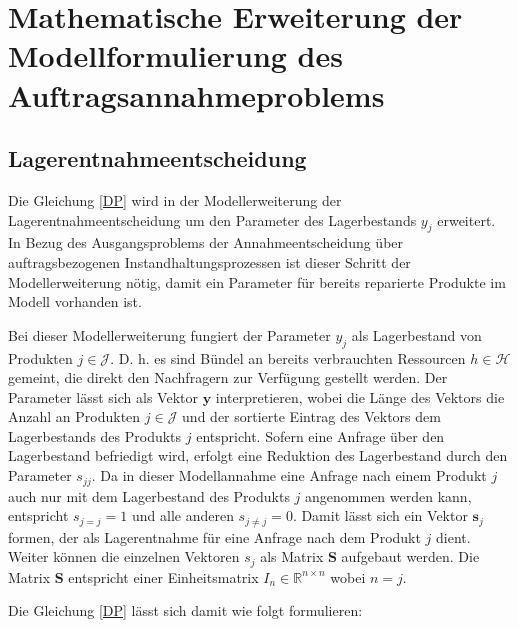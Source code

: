 \section{Mathematische Erweiterung der Modellformulierung des Auftragsannahmeproblems}\label{Umformung}

\subsection{Lagerentnahmeentscheidung}

Die Gleichung \eqref{DP} wird in der Modellerweiterung der Lagerentnahmeentscheidung um den Parameter des Lagerbestands $y_{j}$ erweitert. In Bezug des Ausgangsproblems der Annahmeentscheidung über auftragsbezogenen Instandhaltungsprozessen ist dieser Schritt der Modellerweiterung nötig, damit ein Parameter für bereits reparierte Produkte im Modell vorhanden ist. 

Bei dieser Modellerweiterung fungiert der Parameter $y_{j}$ als Lagerbestand von Produkten $j\in\mathcal{J}$. D. h. es sind Bündel an bereits verbrauchten Ressourcen $h\in\mathcal{H}$ gemeint, die direkt den Nachfragern zur Verfügung gestellt werden. Der Parameter lässt sich als Vektor $\textbf{y}$ interpretieren, wobei die Länge des Vektors die Anzahl an Produkten $j\in\mathcal{J}$ und der sortierte Eintrag des Vektors dem Lagerbestands des Produkts $j$ entspricht. Sofern eine Anfrage über den Lagerbestand befriedigt wird, erfolgt eine Reduktion des Lagerbestand durch den Parameter $s_{jj}$. Da in dieser Modellannahme eine Anfrage nach einem Produkt $j$ auch nur mit dem Lagerbestand des Produkts $j$ angenommen werden kann, entspricht $s_{j=j}=1$ und alle anderen $s_{j\neq j}=0$. Damit lässt sich ein Vektor $\textbf{s}_j$ formen, der als Lagerentnahme für eine Anfrage nach dem Produkt $j$ dient. Weiter können die einzelnen Vektoren $s_{j}$ als Matrix $\textbf{S}$ aufgebaut werden. Die Matrix $\textbf{S}$ entspricht einer Einheitsmatrix $I_{n}\in\mathbb{R}^{n\times n}$ wobei $n=j$.

Die Gleichung \eqref{DP} lässt sich damit wie folgt formulieren:

